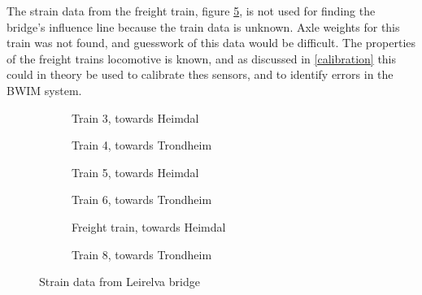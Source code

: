 The strain data from the freight train, figure \ref{fig:strain_train7}, is not used for finding the bridge's influence line because the train data is unknown. Axle weights for this train was not found, and guesswork of this data would be difficult. The properties of the freight trains locomotive is known, and as discussed in \ref{calibration} this could in theory be used to calibrate thes sensors, and to identify errors in the BWIM system.
\begin{figure}[H]
	\centering
	\begin{subfigure}[t]{0.4\textwidth}
		\centering
		
		\caption{Train 3, towards Heimdal}
		\label{fig:strain_train3}
	\end{subfigure}
	\qquad
	\begin{subfigure}[t]{0.4\textwidth}
		\centering
		
		\caption{Train 4, towards Trondheim}
		\label{fig:strain_train4}
	\end{subfigure}
	\begin{subfigure}[t]{0.4\textwidth}
		\centering
		
		\caption{Train 5, towards Heimdal}
		\label{fig:strain_train5}
	\end{subfigure}
	\qquad
  \begin{subfigure}[t]{0.4\textwidth}
    \centering
    
		\caption{Train 6, towards Trondheim}
    \label{fig:strain_train6}
  \end{subfigure}
  \begin{subfigure}[t]{0.4\textwidth}
    \centering
    
		\caption{Freight train, towards Heimdal}
    \label{fig:strain_train7}
  \end{subfigure}
    \qquad
	\begin{subfigure}[t]{0.4\textwidth}
		\centering
		
		\caption{Train 8, towards Trondheim}
		\label{fig:strain_train8}
	\end{subfigure}
  \caption{Strain data from Leirelva bridge}
  \label{fig:strain_all}
\end{figure}
